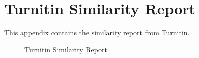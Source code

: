 %
%
%                 

\chapter{Turnitin Similarity Report}
\label{sec:appendixb}

This appendix contains the similarity report from Turnitin.

\begin{figure}[h]
	\centering
	\captionsetup{justification=centering}
	\caption{Turnitin Similarity Report}
	\label{fig:turnitin}
\end{figure}


